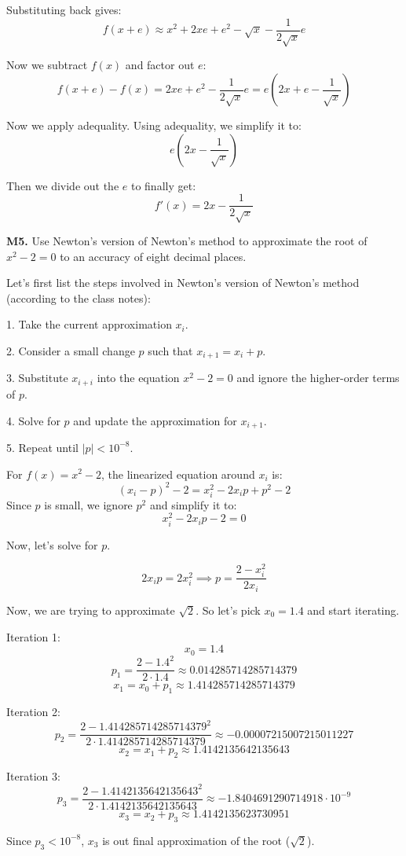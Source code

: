 \documentclass{article}
\begin{document}
Substituting back gives:
\[f(x+e) \approx x^2 + 2xe + e^2 - \sqrt{x} - \frac{1}{2 \sqrt{x}} e\]

Now we subtract $f(x)$ and factor out $e$:
\[f(x+e) - f(x) = 2xe + e^2 - \frac{1}{2 \sqrt{x}} e = e\left(2x + e - \frac{1}{\sqrt{x}}\right)\]

Now we apply adequality. Using adequality, we simplify it to:
\[e(2x - \frac{1}{\sqrt{x}})\]

Then we divide out the $e$ to finally get:
\[f'(x) = 2x - \frac{1}{2 \sqrt{x}}\]


\textbf{M5.} Use Newton's version of Newton's method to approximate the
root of $x^2 - 2 = 0$ to an accuracy of eight decimal places.

Let's first list the steps involved in Newton's version of Newton's method
(according to the class notes):

1. Take the current approximation $x_i$.

2. Consider a small change $p$ such that $x_{i+1} = x_i + p$.

3. Substitute $x_{i+i}$ into the equation $x^2 - 2 = 0$ and ignore the
higher-order terms of $p$.

4. Solve for $p$ and update the approximation for $x_{i+1}$.

5. Repeat until $|p| < 10^{-8}$.

For $f(x) = x^2 - 2$, the linearized equation around $x_i$ is:
\[(x_i - p)^2 - 2 = x_i^2 - 2x_i p + p^2 - 2\]
Since $p$ is small, we ignore $p^2$ and simplify it to:
\[x_i^2 - 2x_i p - 2 = 0\]

Now, let's solve for $p$.

\[2x_i p = 2 x_i^2 \implies p = \frac{2 - x_i^2}{2x_i}\]

Now, we are trying to approximate $\sqrt{2}$. So let's pick $x_0 = 1.4$
and start iterating.

Iteration 1:
\[x_0 = 1.4\]
\[p_1 = \frac{2 - 1.4^2}{2 \cdot 1.4} \approx 0.014285714285714379\]
\[x_1 = x_0 + p_1 \approx 1.414285714285714379\]

Iteration 2:
\[p_2 = \frac{2 - 1.414285714285714379^2}{2 \cdot 1.414285714285714379} \approx -0.00007215007215011227\]
\[x_2 = x_1 + p_2 \approx 1.4142135642135643\]

Iteration 3:
\[p_3 = \frac{2 - 1.4142135642135643^2}{2 \cdot 1.4142135642135643} \approx -1.8404691290714918 \cdot 10^{-9}\]
\[x_3 = x_2 + p_3 \approx 1.4142135623730951\]

Since $p_3 < 10^{-8}$, $x_3$ is out final approximation of the root ($\sqrt{2}$).
\end{document}
